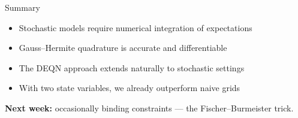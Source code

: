 \documentclass[aspectratio=169, 10pt]{beamer}
\begin{document}
\begin{frame}{Summary}
\begin{itemize}
\item Stochastic models require numerical integration of expectations
\item Gauss--Hermite quadrature is accurate and differentiable
\item The DEQN approach extends naturally to stochastic settings
\item With two state variables, we already outperform naive grids
\end{itemize}

\bigskip
\textbf{Next week:} occasionally binding constraints --- the Fischer--Burmeister trick.
\end{frame}
\end{document}
